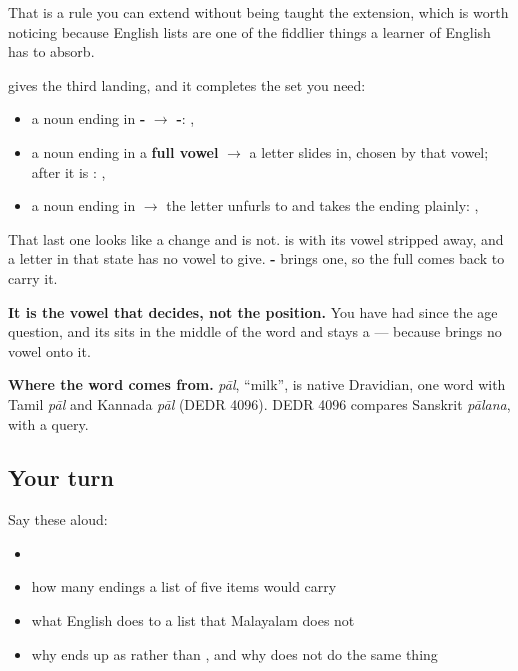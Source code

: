 That is a rule you can extend without being taught the extension, which is worth noticing because English lists are one of the fiddlier things a learner of English has to absorb.

\begin{cousinweb}
\textbf{} gives the third landing, and it completes the set you need:

\begin{itemize}
\raggedright
  \item a noun ending in \textbf{-} $\to$ \textbf{-}: , 
  \item a noun ending in a \textbf{full vowel} $\to$ a letter slides in, chosen by that vowel; after \textbf{} it is \textbf{}: , 
  \item a noun ending in \textbf{} $\to$ the letter unfurls to \textbf{} and takes the ending plainly: , 
\end{itemize}

That last one looks like a change and is not. \textbf{} is \textbf{} with its vowel stripped away, and a letter in that state has no vowel to give. \textbf{-} brings one, so the full \textbf{} comes back to carry it.

\textbf{It is the vowel that decides, not the position.} You have had \textbf{} since the age question, and its \textbf{} sits in the middle of the word and stays a \textbf{} — because \textbf{} brings no vowel onto it.

\textbf{Where the word comes from.} \emph{pāl}, \textquotedblleft{}milk\textquotedblright{}, is native Dravidian, one word with Tamil \emph{pāl} and Kannada \emph{pāl} (DEDR 4096). DEDR 4096 compares Sanskrit \emph{pālana}, with a query.
\end{cousinweb}

\subsection*{Your turn}
Say these aloud:

\begin{itemize}
\raggedright
  \item {}  
  \item how many endings a list of five items would carry
  \item what English does to a list that Malayalam does not
  \item why  ends up as  rather than , and why \textbf{} does not do the same thing
\end{itemize}

